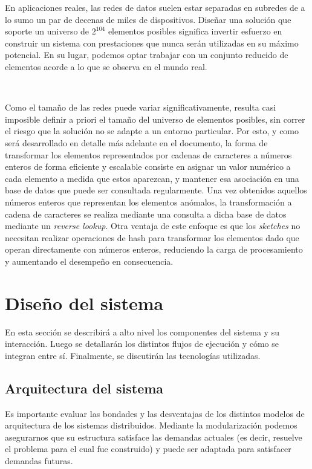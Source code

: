 \documentclass[a4paper,12pt, oneside]{article}
\begin{document}
En aplicaciones reales, las redes de datos suelen estar separadas en subredes de a lo sumo un par de decenas de miles de dispositivos. Diseñar una solución que soporte un universo de $2^{104}$ elementos posibles significa invertir esfuerzo en construir un sistema con prestaciones que nunca serán utilizadas en su máximo potencial. En su lugar, podemos optar trabajar con un conjunto reducido de elementos acorde a lo que se observa en el mundo real.

\

Como el tamaño de las redes puede variar significativamente, resulta casi imposible definir a priori el tamaño del universo de elementos posibles, sin correr el riesgo que la solución no se adapte a un entorno particular. Por esto, y como será desarrollado en detalle más adelante en el documento, la forma de transformar los elementos representados por cadenas de caracteres a números enteros de forma eficiente y escalable consiste en asignar un valor numérico a cada elemento a medida que estos aparezcan, y mantener esa asociación en una base de datos que puede ser consultada regularmente. Una vez obtenidos aquellos números enteros que representan los elementos anómalos, la transformación a cadena de caracteres se realiza mediante una consulta a dicha base de datos mediante un \textit{reverse lookup}. Otra ventaja de este enfoque es que los \textit{sketches} no necesitan realizar operaciones de hash para transformar los elementos dado que operan directamente con números enteros, reduciendo la carga de procesamiento y aumentando el desempeño en consecuencia.

\newpage

\section{Diseño del sistema}
En esta sección se describirá a alto nivel los componentes del sistema y su interacción. Luego se detallarán los distintos flujos de ejecución y cómo se integran entre sí. Finalmente, se discutirán las tecnologías utilizadas.

\subsection{Arquitectura del sistema}

Es importante evaluar las bondades y las desventajas de los distintos modelos de arquitectura de los sistemas distribuidos. Mediante la modularización podemos asegurarnos que su estructura satisface las demandas actuales (es decir, resuelve el problema para el cual fue construido) y puede ser adaptada para satisfacer demandas futuras.
\end{document}
